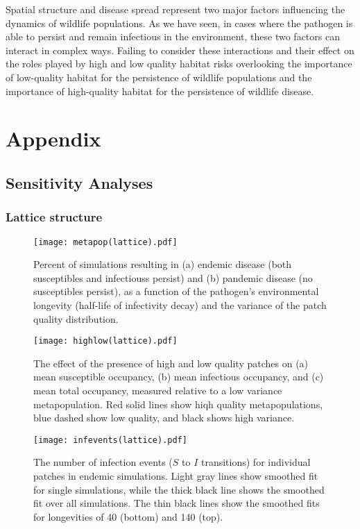 \documentclass{svjour3}
\begin{document}
Spatial structure and disease spread represent two major factors influencing the dynamics of wildlife populations.  As we have seen, in cases where the pathogen is able to persist and remain infectious in the environment, these two factors can interact in complex ways.  Failing to consider these interactions and their effect on the roles played by high and low quality habitat risks overlooking the importance of low-quality habitat for the persistence of wildlife populations and the importance of high-quality habitat for the persistence of wildlife disease.

\clearpage

\section{Appendix}

\subsection{Sensitivity Analyses}

\subsubsection{Lattice structure}

\begin{figure}[h!]
\centering
\texttt{[image: metapop(lattice).pdf]}
\caption{Percent of simulations resulting in (a) endemic disease (both susceptibles and infectiouss persist) and (b) pandemic disease (no susceptibles persist), as a function of the pathogen's environmental longevity (half-life of infectivity decay) and the variance of the patch quality distribution.}
\label{poutcome_lattice}
\end{figure}   

\begin{figure}
\centering
\texttt{[image: highlow(lattice).pdf]}
\caption{The effect of the presence of high and low quality patches on (a) mean susceptible occupancy, (b) mean infectious occupancy, and (c) mean total occupancy, measured relative to  a low variance metapopulation.  Red solid lines show hiqh quality metapopulations, blue dashed show low quality, and black shows high variance.}
\label{sens_lattice}
\end{figure}

\begin{figure}
\centering
\texttt{[image: infevents(lattice).pdf]}
\caption{The number of infection events ($S$ to $I$ transitions) for individual patches in endemic simulations.  Light gray lines show smoothed fit for single simulations, while the thick black line shows the smoothed fit over all simulations.  The thin black lines show the smoothed fits for longevities of 40 (bottom) and 140 (top).}
\label{infections_lattice}
\end{figure}
\end{document}
